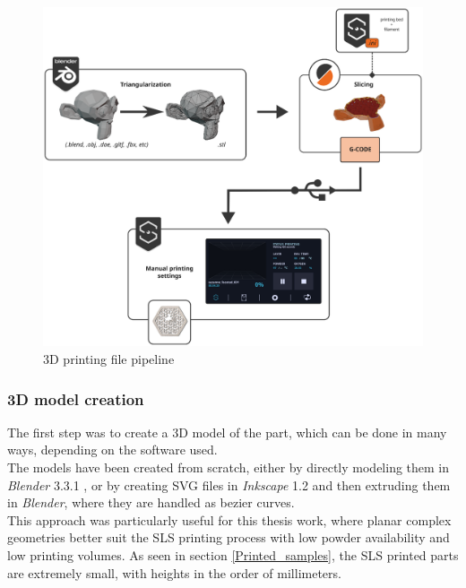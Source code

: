\documentclass{article}
\begin{document}
                  \begin{figure}[h!]
                      \centering 
                      \includegraphics[width=\textwidth]{Pictures/3dprint_file_pipeline_scheme.eps}
                      \caption{3D printing file pipeline}
                      \label{fig:3dprint_file_pipeline_scheme}
                  \end{figure}
  
          \subsubsection{3D model creation\label{3D_model_creation}}
  
          The first step was to create a 3D model of the part, which can be done in many ways, 
          depending on the software used. \\
  
          The models have been created from scratch, either by directly modeling them in \textit{Blender} 3.3.1 \autocites{Blender},
          or by creating SVG files in \textit{Inkscape} 1.2 \autocites{Inkscape} and then extruding them in \textit{Blender}, where
          they are handled as bezier curves. \\
  
          This approach was particularly useful for this thesis work, where planar complex geometries better suit the SLS printing process
          with low powder availability and low printing volumes. As seen in section \ref{Printed_samples}, the SLS printed parts 
          are extremely small, with heights in the order of millimeters. \\
          
\end{document}

